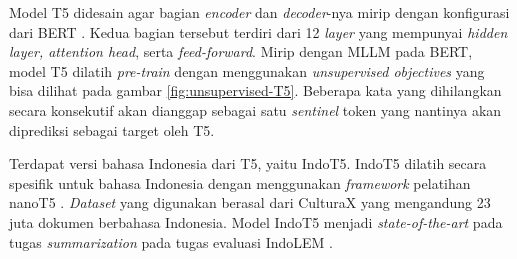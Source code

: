 Model T5 didesain agar bagian \textit{encoder} dan \textit{decoder}-nya mirip dengan konfigurasi dari BERT \parencite{T5}. Kedua bagian tersebut terdiri dari 12 \textit{layer} yang mempunyai \textit{hidden layer, attention head}, serta \textit{feed-forward}. Mirip dengan MLLM pada BERT, model T5 dilatih \textit{pre-train} dengan menggunakan \textit{unsupervised objectives} yang bisa dilihat pada gambar \ref{fig:unsupervised-T5}. Beberapa kata yang dihilangkan secara konsekutif akan dianggap sebagai satu \textit{sentinel} token yang nantinya akan diprediksi sebagai target oleh T5.

Terdapat versi bahasa Indonesia dari T5, yaitu IndoT5. IndoT5 dilatih secara spesifik untuk bahasa Indonesia dengan menggunakan \textit{framework} pelatihan nanoT5 \parencite{indoT5}. \textit{Dataset} yang digunakan berasal dari CulturaX yang mengandung 23 juta dokumen berbahasa Indonesia. Model IndoT5 menjadi \textit{state-of-the-art} pada tugas \textit{summarization} pada tugas evaluasi IndoLEM \parencite{indoT5}.
